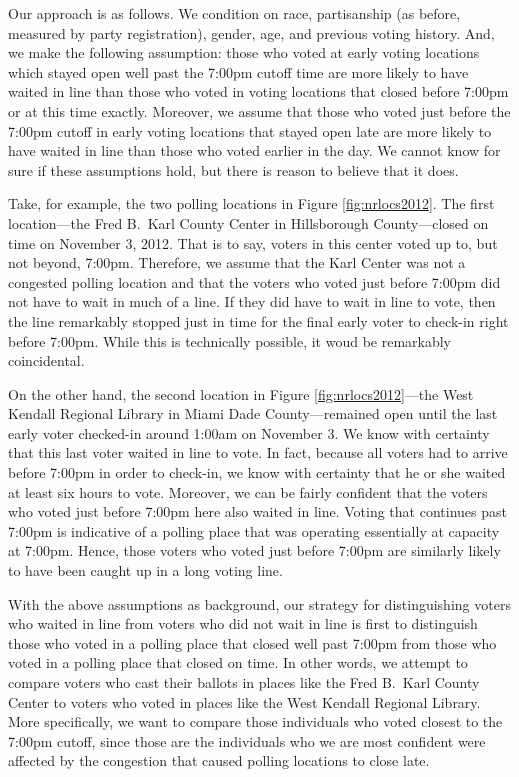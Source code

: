\documentclass[12pt,titlepage]{article}
\begin{document}
Our approach is as follows.  We condition on race, partisanship (as
before, measured by party registration), gender, age, and previous
voting history.  And, we make the following assumption: those who
voted at early voting locations which stayed open well past the 7:00pm
cutoff time are more likely to have waited in line than those who
voted in voting locations that closed before 7:00pm or at this time
exactly.  Moreover, we assume that those who voted just before the
7:00pm cutoff in early voting locations that stayed open late are more
likely to have waited in line than those who voted earlier in the day.
We cannot know for sure if these assumptions hold, but there is reason
to believe that it does.

Take, for example, the two polling locations in Figure
\ref{fig:nrlocs2012}.  The first location---the Fred B.\ Karl County
Center in Hillsborough County---closed on time on November 3,
2012. That is to say, voters in this center voted up to, but not
beyond, 7:00pm.  Therefore, we assume that the Karl Center was not a
congested polling location and that the voters who voted just before
7:00pm did not have to wait in much of a line.  If they did have to
wait in line to vote, then the line remarkably stopped just in time
for the final early voter to check-in right before 7:00pm.  While this
is technically possible, it woud be remarkably coincidental.

On the other hand, the second location in Figure
\ref{fig:nrlocs2012}---the West Kendall Regional Library in Miami Dade
County---remained open until the last early voter checked-in around
1:00am on November 3.  We know with certainty that this last voter
waited in line to vote.  In fact, because all voters had to arrive
before 7:00pm in order to check-in, we know with certainty that he or
she waited at least six hours to vote.  Moreover, we can be fairly
confident that the voters who voted just before 7:00pm here also
waited in line.  Voting that continues past 7:00pm is indicative of a
polling place that was operating essentially at capacity at 7:00pm.
Hence, those voters who voted just before 7:00pm are similarly likely
to have been caught up in a long voting line.

With the above assumptions as background, our strategy for
distinguishing voters who waited in line from voters who did not wait
in line is first to distinguish those who voted in a polling place
that closed well past 7:00pm from those who voted in a polling place
that closed on time.  In other words, we attempt to compare voters who
cast their ballots in places like the Fred B.\ Karl County Center to
voters who voted in places like the West Kendall Regional Library.
More specifically, we want to compare those individuals who voted
closest to the 7:00pm cutoff, since those are the individuals who we
are most confident were affected by the congestion that caused polling
locations to close late.
 
\end{document}
